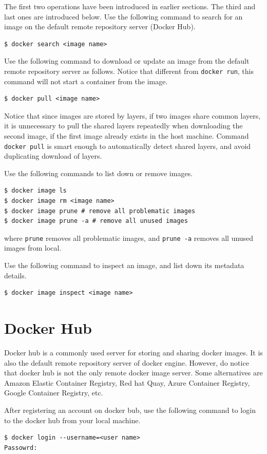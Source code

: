 The first two operations have been introduced in earlier sections. The third and last ones are introduced below. Use the following command to search for an image on the default remote repository server (Docker Hub).
\begin{lstlisting}
$ docker search <image name>
\end{lstlisting}
Use the following command to download or update an image from the default remote repository server as follows. Notice that different from \verb|docker run|, this command will not start a container from the image.
\begin{lstlisting}
$ docker pull <image name>
\end{lstlisting}
Notice that since images are stored by layers, if two images share common layers, it is unnecessary to pull the shared layers repeatedly when downloading the second image, if the first image already exists in the host machine. Command \verb|docker pull| is smart enough to automatically detect shared layers, and avoid duplicating download of layers.

Use the following commands to list down or remove images.
\begin{lstlisting}
$ docker image ls
$ docker image rm <image name>
$ docker image prune # remove all problematic images
$ docker image prune -a # remove all unused images
\end{lstlisting}
where \verb|prune| removes all problematic images, and \verb|prune -a| removes all unused images from local.

Use the following command to inspect an image, and list down its metadata details.
\begin{lstlisting}
$ docker image inspect <image name>
\end{lstlisting}

\section{Docker Hub}

Docker hub is a commonly used server for storing and sharing docker images. It is also the default remote repository server of docker engine. However, do notice that docker hub is not the only remote docker image server. Some alternatives are Amazon Elastic Container Registry, Red hat Quay, Azure Container Registry, Google Container Registry, etc.

After registering an account on docker bub, use the following command to login to the docker hub from your local machine.
\begin{lstlisting}
$ docker login --username=<user name>
Passowrd:
\end{lstlisting}

